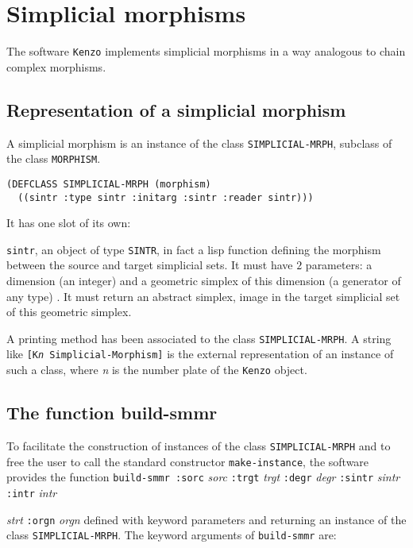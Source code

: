 \chapter {Simplicial morphisms}

The software {\tt Kenzo} implements simplicial morphisms in a way analogous to
chain complex morphisms.

\section {Representation of a  simplicial morphism}

A simplicial morphism is  an instance of the class {\tt SIMPLICIAL-MRPH}, 
subclass of the class {\tt MORPHISM}.
{\footnotesize\begin{verbatim}
(DEFCLASS SIMPLICIAL-MRPH (morphism)
  ((sintr :type sintr :initarg :sintr :reader sintr)))
\end{verbatim}}
It has one slot of its own:
\begin{description}
\item {{\tt sintr}}, an object of type {\tt SINTR}, in fact a lisp function defining the morphism
between the source and target simplicial sets. It must have  $2$ parameters:  a dimension (an integer)
and a geometric simplex of this dimension (a generator of any type) .
It must return  an abstract simplex, image in the target simplicial set of this geometric simplex.
\end{description}
A printing method has been associated to the class {\tt SIMPLICIAL-MRPH}.
A string like {\tt [K{\em n} Simplicial-Morphism]} is the  external representation of an instance of
such a class,  where {\em n} is the number plate of the {\tt Kenzo} object.

\section {The function build-smmr}

To facilitate the construction of instances 
of the class {\tt SIMPLICIAL-MRPH} and to free  the user to call
the standard constructor {\tt make-instance}, the software provides the function
\vskip 0.35cm
{\tt build-smmr :sorc} {\em sorc} {\tt :trgt} {\em trgt} {\tt :degr} {\em degr} {\tt :sintr} {\em sintr}
{\tt :intr} {\em intr} \par
\hspace*{22.5mm}{\tt :strt} {\em strt} {\tt :orgn} {\em orgn}
\vskip 0.35cm
defined with keyword parameters and returning an instance of the class {\tt SIMPLICIAL-MRPH}.
The keyword arguments of {\tt build-smmr} are:

